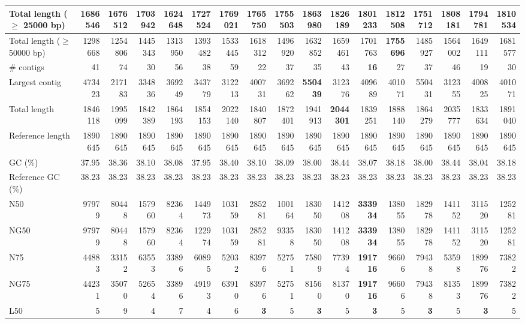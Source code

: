 \documentclass[12pt,a4paper]{article}
\begin{document}
\begin{table}[ht]
\begin{center}
\begin{tabular}{|l*{16}{|r}|}
Total length ($\geq$ 25000 bp) & 1686546 & 1676512 & 1703942 & 1624648 & 1727524 & 1769021 & 1765750 & 1755503 & {\bf 1863980} & 1826189 & 1801233 & 1812508 & 1751712 & 1808181 & 1794781 & 1810534 \\ \hline
Total length ($\geq$ 50000 bp) & 1298668 & 1254806 & 1445343 & 1313950 & 1393482 & 1533445 & 1618312 & 1496920 & 1632852 & 1659461 & 1701763 & {\bf 1755696} & 1485927 & 1564002 & 1649111 & 1681577 \\ \hline
\# contigs & 41 & 74 & 30 & 56 & 38 & 59 & 22 & 37 & 35 & 43 & {\bf 16} & 27 & 37 & 46 & 19 & 30 \\ \hline
Largest contig & 473423 & 217183 & 334836 & 369249 & 343779 & 312213 & 400731 & 369262 & {\bf 550439} & 312376 & 409689 & 401071 & 550431 & 312355 & 400825 & 401071 \\ \hline
Total length & 1846118 & 1995099 & 1842389 & 1864193 & 1854153 & 2022140 & 1840807 & 1872401 & 1941913 & {\bf 2044301} & 1839251 & 1888140 & 1864279 & 2035777 & 1833634 & 1891040 \\ \hline
Reference length & 1890645 & 1890645 & 1890645 & 1890645 & 1890645 & 1890645 & 1890645 & 1890645 & 1890645 & 1890645 & 1890645 & 1890645 & 1890645 & 1890645 & 1890645 & 1890645 \\ \hline
GC (\%) & 37.95 & 38.36 & 38.10 & 38.08 & 37.95 & 38.40 & 38.10 & 38.09 & 38.00 & 38.44 & 38.07 & 38.18 & 38.00 & 38.44 & 38.04 & 38.18 \\ \hline
Reference GC (\%) & 38.23 & 38.23 & 38.23 & 38.23 & 38.23 & 38.23 & 38.23 & 38.23 & 38.23 & 38.23 & 38.23 & 38.23 & 38.23 & 38.23 & 38.23 & 38.23 \\ \hline
N50 & 97979 & 80448 & 157960 & 82364 & 144973 & 103159 & 285281 & 100164 & 183050 & 141208 & {\bf 333934} & 138055 & 182978 & 141152 & 311520 & 125281 \\ \hline
NG50 & 97979 & 80448 & 157960 & 82364 & 122974 & 103159 & 285281 & 93358 & 183050 & 141208 & {\bf 333934} & 138055 & 182978 & 141152 & 311520 & 125281 \\ \hline
N75 & 44883 & 33152 & 63553 & 33896 & 60895 & 52032 & 83976 & 52751 & 75809 & 77394 & {\bf 191716} & 96606 & 79438 & 53598 & 189976 & 73822 \\ \hline
NG75 & 44231 & 35070 & 52654 & 33896 & 49193 & 63910 & 83976 & 52751 & 81560 & 81370 & {\bf 191716} & 96606 & 79438 & 81353 & 189976 & 73822 \\ \hline
L50 & 5 & 9 & 4 & 7 & 4 & 6 & {\bf 3} & 5 & {\bf 3} & 5 & {\bf 3} & 5 & {\bf 3} & 5 & {\bf 3} & 5 \\ \hline

\end{tabular}
\end{center}
\end{table}
\end{document}
